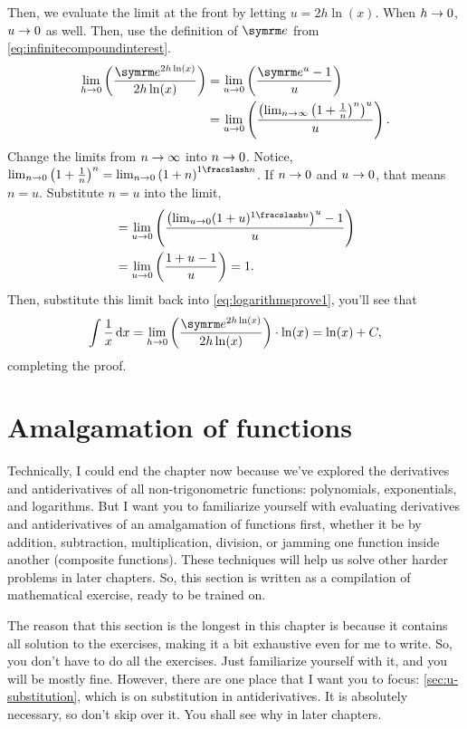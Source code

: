 Then, we evaluate the limit at the front by letting $u = 2h\ln(x)$. When $h \rightarrow 0$, $u \rightarrow 0$ as well. Then, use the definition of $\e$ from \cref{eq:infinitecompoundinterest}.
\begin{align*}
  \lim_{h \appr 0}\left(\frac{\e^{2h\ln(x)}}{2h\ln(x)}\right) & = \lim_{u \appr 0}\left(\frac{\e^u - 1}{u}\right)                                                             \\
                                                              & = \lim_{u \appr 0}\left(\frac{\left(\lim_{n \appr \infty}\left(1 + \frac{1}{n}\right)^n\right)^u}{u}\right).
\end{align*}
Change the limits from $n \rightarrow \infty$ into $n \rightarrow 0$. Notice, $\lim_{n \appr 0}\left(1 + \frac{1}{n}\right)^n = \lim_{n \appr 0}\left(1 + n\right)^{\flatfrac{1}{n}}$. If $n \rightarrow 0$ and $u \rightarrow 0$, that means $n = u$. Substitute $n = u$ into the limit,
\begin{align*}
   & = \lim_{u \appr 0}\left(\frac{\left(\lim_{u \appr 0}(1 + u)^{\flatfrac{1}{u}}\right)^u - 1}{u}\right) \\
   & = \lim_{u \appr 0}\left(\frac{1 + u - 1}{u}\right) = 1.
\end{align*}
Then, substitute this limit back into \cref{eq:logarithmsprove1}, you'll see that
\begin{equation*}
  \int\frac{1}{x}\odif{x} = \lim_{h \appr 0}\left(\frac{\e^{2h\ln(x)}}{2h\ln(x)}\right) \cdot \ln(x) = \ln(x) + C,
\end{equation*}
completing the proof.

\section{Amalgamation of functions}

Technically, I could end the chapter now because we've explored the derivatives and antiderivatives of all non-trigonometric functions: polynomials, exponentials, and logarithms. But I want you to familiarize yourself with evaluating derivatives and antiderivatives of an amalgamation of functions first, whether it be by addition, subtraction, multiplication, division, or jamming one function inside another (composite functions). These techniques will help us solve other harder problems in later chapters. So, this section is written as a compilation of mathematical exercise, ready to be trained on.

The reason that this section is the longest in this chapter is because it contains all solution to the exercises, making it a bit exhaustive even for me to write. So, you don't have to do all the exercises. Just familiarize yourself with it, and you will be mostly fine. However, there are one place that I want you to focus: \cref{sec:u-substitution}, which is on substitution in antiderivatives. It is absolutely necessary, so don't skip over it. You shall see why in later chapters.

